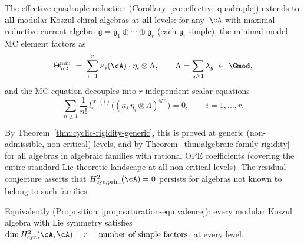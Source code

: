 \begin{conjecture}
\label{conj:scalar-saturation-universality}
\ClaimStatusConjectured
The effective quadruple reduction
\textup{(}Corollary~\textup{\ref{cor:effective-quadruple}}\textup{)}
extends to \textbf{all} modular Koszul chiral algebras at
\textbf{all} levels: for
any~$\cA$ with maximal reductive current algebra
$\mathfrak{g} = \mathfrak{g}_1 \oplus \cdots \oplus \mathfrak{g}_r$
\textup{(}each $\mathfrak{g}_i$ simple\textup{)}, the
minimal-model MC element factors as
\begin{equation}\label{eq:theta-multi-scalar}
\Theta^{\min}_{\cA}
\;=\; \sum_{i=1}^r \kappa_i(\cA) \cdot \eta_i \otimes \Lambda,
\qquad
\Lambda = \sum_{g \geq 1} \lambda_g \;\in\; \Gmod,
\end{equation}
and the MC equation decouples into $r$ independent scalar
equations
\begin{equation}\label{eq:mc-decoupled}
\sum_{n \geq 1} \frac{1}{n!}\,
l_n^{\mathrm{tr},(i)}
\bigl((\kappa_i \,\eta_i \otimes \Lambda)^{\otimes n}\bigr) = 0,
\qquad i = 1, \ldots, r.
\end{equation}

By Theorem~\textup{\ref{thm:cyclic-rigidity-generic}}, this
is proved at generic \textup{(}non-admissible,
non-critical\textup{)} levels, and by
Theorem~\textup{\ref{thm:algebraic-family-rigidity}} for all
algebras in algebraic families with rational OPE coefficients
\textup{(}covering the entire standard Lie-theoretic landscape
at all non-critical levels\textup{)}.
The residual conjecture asserts that
$H^2_{\mathrm{cyc,prim}}(\cA) = 0$ persists for algebras not
known to belong to such families.

Equivalently
\textup{(}Proposition~\textup{\ref{prop:saturation-equivalence}}\textup{)}:
every modular Koszul algebra with Lie symmetry satisfies
$\dim H^2_{\mathrm{cyc}}(\cA, \cA) = r =
\text{number of simple factors}$, at every level.
\end{conjecture}

